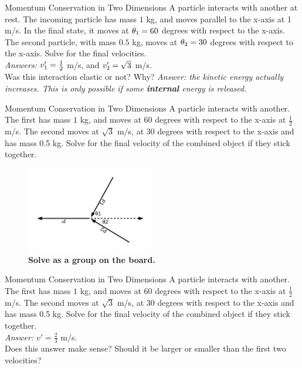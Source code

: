 \documentclass{beamer}
\begin{document}
\begin{frame}{Momentum Conservation in Two Dimensions}
\small
A particle interacts with another at rest.  The incoming particle has mass $1$ kg, and moves parallel to the x-axis at 1 m/s.  In the final state, it moves at $\theta_{\rm 1} = 60$ degrees with respect to the x-axis.  The second particle, with mass $0.5$ kg, moves at $\theta_{\rm 2} = 30$ degrees with respect to the x-axis.  Solve for the final velocities. \\ \vspace{0.5cm}
\textit{Answers:} $v_{\rm 1}' = \frac{1}{2}$ m/s, and $v_{\rm 2}' = \sqrt{3}$ m/s. \\ \vspace{0.5cm}
Was this interaction elastic or not?  Why?  \textit{Answer: the kinetic energy actually increases.  This is only possible if some \textbf{internal} energy is released.}
\end{frame}

\begin{frame}{Momentum Conservation in Two Dimensions}
\small
A particle interacts with another.  The first has mass $1$ kg, and moves at 60 degrees with respect to the x-axis at $\frac{1}{2}$ m/s.  The second moves at $\sqrt{3}$ m/s, at 30 degrees with respect to the x-axis and has mass 0.5 kg.  Solve for the final velocity of the combined object if they stick together. \\ \vspace{0.5cm}
\begin{figure}
\centering
\includegraphics[width=0.5\textwidth]{figures/2d_2.pdf}
\caption{\label{fig:2d_2} \textbf{Solve as a group on the board.}}
\end{figure}
\end{frame}

\begin{frame}{Momentum Conservation in Two Dimensions}
\small
A particle interacts with another.  The first has mass $1$ kg, and moves at 60 degrees with respect to the x-axis at $\frac{1}{2}$ m/s.  The second moves at $\sqrt{3}$ m/s, at 30 degrees with respect to the x-axis and has mass 0.5 kg.  Solve for the final velocity of the combined object if they stick together. \\ \vspace{0.5cm}
\textit{Answer:} $v' = \frac{2}{3}$ m/s. \\ \vspace{0.5cm}
Does this answer make sense?  Should it be larger or smaller than the first two velocities?
\end{frame}
\end{document}
